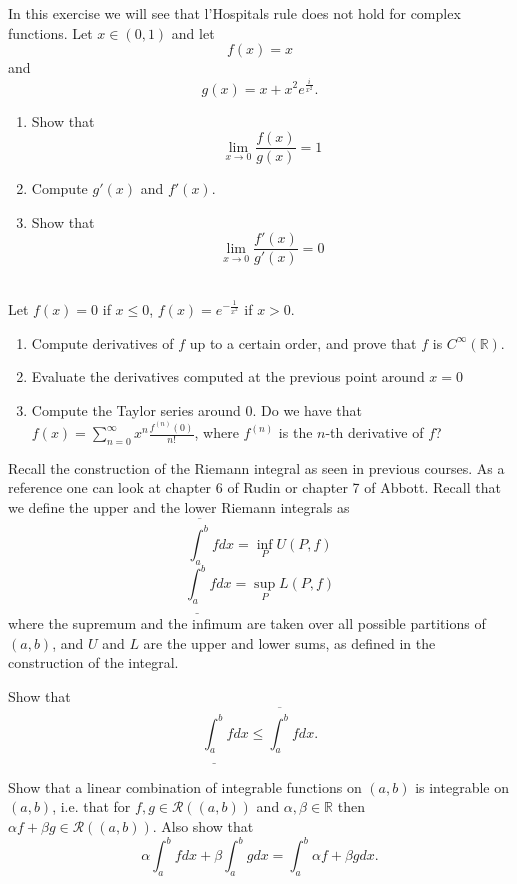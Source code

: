 \documentclass[11pt]{article}%
\newcommand{\R}{\mathbb{R}}
\begin{document}
\begin{Exercise}[title=**]
	In this exercise we will see that l'Hospitals rule does not hold for complex functions. Let $x\in(0,1)$ and let $$f(x)=x$$ and $$g(x)=x + x^2 e^\frac{i}{x^2}.$$
	\begin{enumerate}
		\item Show that $$\lim_{x\to 0} \frac{f(x)}{g(x)} = 1$$
		\item Compute $g'(x)$ and $f'(x)$.
		\item Show that $$\lim_{x\to 0} \frac{f'(x)}{g'(x)} = 0$$
	\end{enumerate}
\end{Exercise}

\begin{Exercise}\\
Let $f(x)=0$ if $x\leq0$, $f(x)=e^{-\frac{1}{x^2}}$ if $x>0$.
\begin{enumerate}
	\item Compute derivatives of $f$ up to a certain order, and prove that $f$ is $C^{\infty}(\mathbb{R})$.
	\item Evaluate the derivatives computed at the previous point around $x=0$
	\item Compute the Taylor series around 0. Do we have that $f(x)=\displaystyle\sum_{n=0}^{\infty} x^n \frac{f^{(n)}(0)}{n!}$, where $f^{(n)}$ is the $n$-th derivative of $f$?
\end{enumerate}
\end{Exercise}

\begin{Exercise}[title={**}]
	Recall the construction of the Riemann integral as seen in previous courses. As a reference one can look at chapter 6 of Rudin or chapter 7 of Abbott. Recall that we define the upper and the lower Riemann integrals as
	$$\overline{\int_a^b} f dx = \inf_P U(P,f)$$
	$$\underline{\int_a^b} f dx = \sup_P L(P,f)$$
	where the supremum and the infimum are taken over all possible partitions of $(a,b)$, and $U$ and $L$ are the upper and lower sums, as defined in the construction of the integral.
	
	Show that
	$$\underline{\int_a^b} f dx \leq \overline{\int_a^b} f dx.$$
	
\end{Exercise}

\begin{Exercise} [title={**}]
	Show that a linear combination of integrable functions on $(a,b)$ is integrable on $(a,b)$, i.e. that for $f,g\in\mathcal R((a,b))$ and $\alpha, \beta\in\R$ then $\alpha f + \beta g \in \mathcal  R((a,b))$. Also show that
	$$\alpha\int_a^b f dx + \beta\int_a^b g dx = \int_a^b \alpha f + \beta g dx.$$
\end{Exercise}
\end{document}
